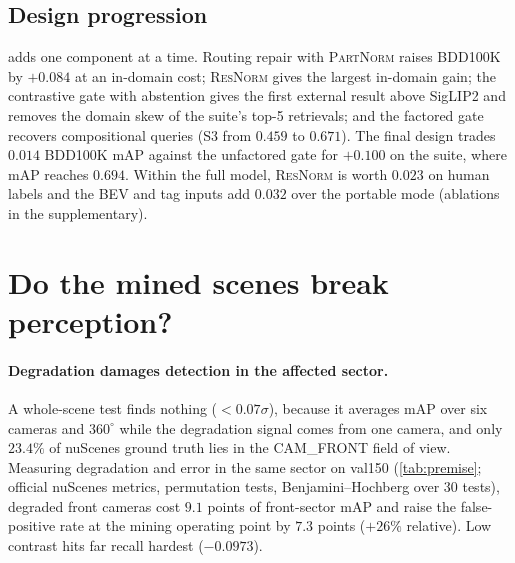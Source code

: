 \documentclass[10pt,twocolumn,letterpaper]{article}
\begin{document}
\begin{table}[t]\centering\small
\caption{\textbf{Three human-graded regimes} (mAP). Late fusion adds $z$-scored
rankers without learning; on object queries the lookup and metadata are constant,
so both fusions equal SigLIP2. SceneMiner rows score the five-seed ensemble
($0.803$; \cref{tab:master} averages per-seed mAP).}
\label{tab:regimes}
\resizebox{\columnwidth}{!}{%
\setlength{\tabcolsep}{4pt}}
\end{table}

\begin{table}[t]\centering\small
\caption{\textbf{Design progression}, each step trained with the same recipe (mAP;
subscripts: sd over five seeds). Degradation: $550$ human-labelled scenes.
BDD100K: $1000$ external images. Suite: the $150$ evaluation queries.}
\label{tab:design}
\resizebox{\columnwidth}{!}{%
\setlength{\tabcolsep}{4pt}}
\end{table}

\subsection{Design progression}
 adds one component at a time. Routing repair with
\textsc{PartNorm} raises BDD100K by $+0.084$ at an in-domain cost; \textsc{ResNorm}
gives the largest in-domain gain; the contrastive gate with abstention gives the
first external result above SigLIP2 and removes the domain skew of the suite's top-5
retrievals; and the factored gate recovers compositional queries (S3 from $0.459$
to $0.671$). The final design trades $0.014$ BDD100K mAP against the unfactored gate
for $+0.100$ on the suite, where mAP reaches $0.694$. Within the full model,
\textsc{ResNorm} is worth $0.023$ on human labels and the BEV and tag inputs add
$0.032$ over the portable mode (ablations in the supplementary).


\section{Do the mined scenes break perception?}
\label{sec:premise}

\paragraph{Degradation damages detection in the affected sector.} A whole-scene
test finds nothing ($<0.07\sigma$), because it averages mAP over six cameras and
$360^\circ$ while the degradation signal comes from one camera, and only $23.4\%$ of
nuScenes ground truth lies in the CAM\_FRONT field of view. Measuring degradation
and error in the same sector on val150 (\cref{tab:premise}; official nuScenes
metrics, permutation tests, Benjamini--Hochberg over $30$ tests), degraded front
cameras cost $9.1$ points of front-sector mAP and raise the false-positive rate at
the mining operating point by $7.3$ points ($+26\%$ relative). Low contrast hits far
recall hardest ($-0.0973$).
\end{document}
